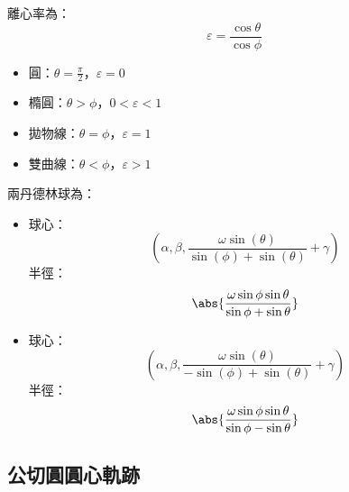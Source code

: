 \documentclass[a4paper,12pt]{article}
\begin{document}
離心率為：
\[\varepsilon=\frac{\cos\theta}{\cos\phi}\]
\begin{itemize}
\item 圓：$\theta=\frac{\pi}{2}$，$\varepsilon=0$
\item 橢圓：$\theta>\phi$，$0<\varepsilon<1$
\item 拋物線：$\theta=\phi$，$\varepsilon=1$
\item 雙曲線：$\theta<\phi$，$\varepsilon>1$
\end{itemize}

兩丹德林球為：
\begin{itemize}
\item 球心：
\[\left(\alpha,\beta,\frac{\omega\sin(\theta)}{\sin(\phi)+\sin(\theta)}+\gamma\right)\]
半徑：
\[\abs{\frac{\omega\sin\phi\sin\theta}{\sin\phi+\sin\theta}}\]
\item 球心：
\[\left(\alpha,\beta,\frac{\omega\sin(\theta)}{-\sin(\phi)+\sin(\theta)}+\gamma\right)\]
半徑：
\[\abs{\frac{\omega\sin\phi\sin\theta}{\sin\phi-\sin\theta}}\]
\end{itemize}
\subsection{公切圓圓心軌跡}
\end{document}
